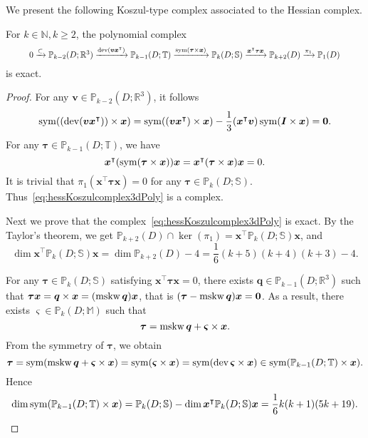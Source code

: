 We present the following Koszul-type complex associated to the Hessian complex.
\begin{lemma}
For $k\in \mathbb N, k\geq 2$, the polynomial complex
\begin{equation}\label{eq:hessKoszulcomplex3dPoly}
\resizebox{.91\hsize}{!}{$
0\xrightarrow{\subset}\mathbb P_{k-2}(D;\mathbb R^3) \xrightarrow{\dev(\boldsymbol v\boldsymbol x^{\intercal})} \mathbb P_{k-1}(D;\mathbb T) \xrightarrow{\sym(\boldsymbol\tau\times\boldsymbol x)} \mathbb P_{k}(D;\mathbb S)\xrightarrow{\boldsymbol x^{\intercal}\boldsymbol\tau\boldsymbol x} \mathbb P_{k+2}(D)\xrightarrow{\pi_1}\mathbb P_{1}(D)
$}
\end{equation}
is exact.
\end{lemma}
\begin{proof}
For any $\boldsymbol v\in\mathbb P_{k-2}(D;\mathbb R^3)$, it follows
\[
\operatorname{sym}((\operatorname{dev}(\boldsymbol v\boldsymbol x^{\intercal}))\times\boldsymbol x)=\operatorname{sym}((\boldsymbol v\boldsymbol x^{\intercal})\times\boldsymbol x)-\frac{1}{3}(\boldsymbol x^{\intercal}\boldsymbol v)\operatorname{sym}(\boldsymbol I\times\boldsymbol x)=\boldsymbol0.
\]
For any $\boldsymbol \tau\in\mathbb P_{k-1}(D;\mathbb T)$, we have
\[
\boldsymbol x^{\intercal}(\operatorname{sym}(\boldsymbol\tau\times\boldsymbol x))\boldsymbol x=\boldsymbol x^{\intercal}(\boldsymbol\tau\times\boldsymbol x)\boldsymbol x=0.
\]
It is trivial that $\pi_1(\boldsymbol x^{\intercal}\boldsymbol\tau\boldsymbol x)=0$ for any $\boldsymbol\tau\in\mathbb P_{k}(D;\mathbb S)$. Thus~\eqref{eq:hessKoszulcomplex3dPoly} is a complex.

Next we prove that the complex~\eqref{eq:hessKoszulcomplex3dPoly} is exact.
By the Taylor's theorem, we get $\mathbb P_{k+2}(D)\cap\ker(\pi_1)=\boldsymbol x^{\intercal}\mathbb P_{k}(D;\mathbb S)\boldsymbol x$, and
\[
\dim\boldsymbol x^{\intercal}\mathbb P_{k}(D;\mathbb S)\boldsymbol x=\dim\mathbb P_{k+2}(D)-4=\frac{1}{6}(k+5)(k+4)(k+3)-4.
\]

For any $\boldsymbol\tau\in\mathbb P_{k}(D;\mathbb S)$ satisfying $\boldsymbol x^{\intercal}\boldsymbol\tau\boldsymbol x=0$, there exists $\boldsymbol q\in\mathbb P_{k-1}(D;\mathbb R^3)$ such that $\boldsymbol\tau\boldsymbol x=\boldsymbol q\times \boldsymbol x=(\operatorname{mskw}\boldsymbol q) \boldsymbol x$, that is $(\boldsymbol\tau-\operatorname{mskw}\boldsymbol q)\boldsymbol x=\boldsymbol 0$. As a result, there exists $\boldsymbol\varsigma\in\mathbb P_{k}(D;\mathbb M)$ such that
\[
\boldsymbol\tau=\operatorname{mskw}\boldsymbol q+\boldsymbol\varsigma\times\boldsymbol x.
\]
From the symmetry of $\boldsymbol\tau$, we obtain
\[
\boldsymbol\tau=\operatorname{sym}(\operatorname{mskw}\boldsymbol q+\boldsymbol\varsigma\times\boldsymbol x)=\operatorname{sym}(\boldsymbol\varsigma\times\boldsymbol x)=\operatorname{sym}(\operatorname{dev}\boldsymbol\varsigma\times\boldsymbol x)\in\operatorname{sym}(\mathbb P_{k-1}(D;\mathbb T)\times\boldsymbol x).
\]
Hence
\begin{equation}\label{eq:dimsymx}
\dim\operatorname{sym}(\mathbb P_{k-1}(D;\mathbb T)\times\boldsymbol x)=\mathbb P_{k}(D;\mathbb S)-\dim\boldsymbol x^{\intercal}\mathbb P_{k}(D;\mathbb S)\boldsymbol x=\frac{1}{6}k(k+1)(5k+19).
\end{equation}


\end{proof}
